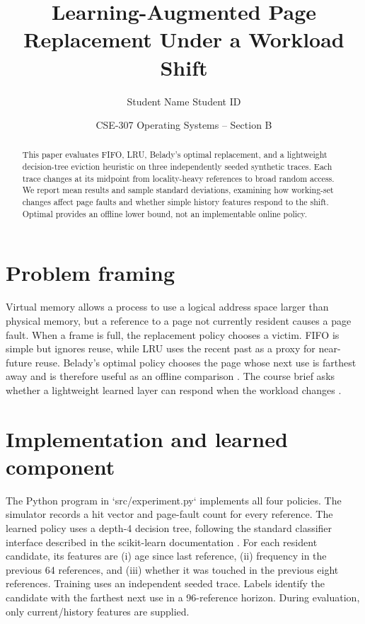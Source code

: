 \documentclass[10pt,a4paper]{article}
\title{Learning-Augmented Page Replacement Under a Workload Shift}
\author{Student Name \quad Student ID}
\date{CSE-307 Operating Systems -- Section B}
\begin{document}
\maketitle

\begin{abstract}
This paper evaluates FIFO, LRU, Belady's optimal replacement, and a lightweight decision-tree eviction heuristic on three independently seeded synthetic traces. Each trace changes at its midpoint from locality-heavy references to broad random access. We report mean results and sample standard deviations, examining how working-set changes affect page faults and whether simple history features respond to the shift. Optimal provides an offline lower bound, not an implementable online policy.
\end{abstract}

\section{Problem framing}
Virtual memory allows a process to use a logical address space larger than physical memory, but a reference to a page not currently resident causes a page fault. When a frame is full, the replacement policy chooses a victim. FIFO is simple but ignores reuse, while LRU uses the recent past as a proxy for near-future reuse. Belady's optimal policy chooses the page whose next use is farthest away and is therefore useful as an offline comparison \cite{belady1966,mattson1970}. The course brief asks whether a lightweight learned layer can respond when the workload changes \cite{brief2026}.

\section{Implementation and learned component}
The Python program in `src/experiment.py` implements all four policies. The simulator records a hit vector and page-fault count for every reference. The learned policy uses a depth-4 decision tree, following the standard classifier interface described in the scikit-learn documentation \cite{sklearn2025}. For each resident candidate, its features are (i) age since last reference, (ii) frequency in the previous 64 references, and (iii) whether it was touched in the previous eight references. Training uses an independent seeded trace. Labels identify the candidate with the farthest next use in a 96-reference horizon. During evaluation, only current/history features are supplied.
\end{document}
